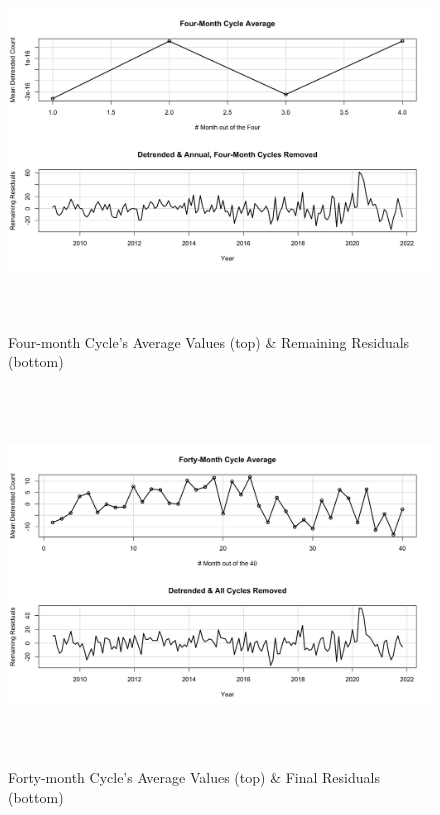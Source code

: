 \documentclass[10pt]{article}
\begin{document}
\begin{figure}[ht!]
    \centering
    \includegraphics[height=100mm, width=125mm]{4m-cyc-removed.png}
    \caption{Four-month Cycle's Average Values (top) \& Remaining Residuals (bottom)}
\end{figure}

\begin{figure}[ht!]
    \centering
    \includegraphics[height=100mm, width=125mm]{40m-cyc-removed.png}
    \caption{Forty-month Cycle's Average Values (top) \& Final Residuals (bottom)}
\end{figure}
\end{document}
